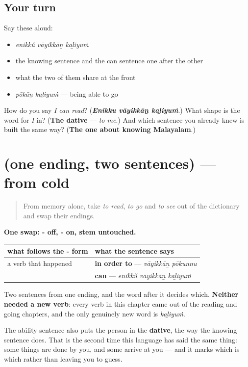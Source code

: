 \subsection*{Your turn}
Say these aloud:

\begin{itemize}
\raggedright
  \item \emph{enikkŭ vāyikkāṉ kaḻiyuṁ}
  \item the knowing sentence and the can sentence one after the other
  \item what the two of them share at the front
  \item \emph{pōkāṉ kaḻiyuṁ} — being able to go
\end{itemize}

\begin{tcolorbox}[breakable,colback=teal!4,colframe=teal!35!black,title={Before you move on}]
How do you say \emph{I can read}? (\emph{\textbf{Enikku vāyikkāṉ kaḻiyuṁ}}.) What shape is the word for \emph{I} in? (\textbf{The dative} — \emph{to me}.) And which sentence you already knew is built the same way? (\textbf{The one about knowing Malayalam}.)
\end{tcolorbox}
\section[(one ending, two sentences)]{(one ending, two sentences) — from cold}

\label{lesson:ML-R74-aan-recall}



\begin{quote}
From memory alone, take \emph{to read}, \emph{to go} and \emph{to see} out of the dictionary and swap their endings.
\end{quote}

\begin{grammarlens}[title={Grammar Lens: the swap, and what it buys}]
\textbf{One swap: - off, - on, stem untouched.}

\noindent
\begin{tabularx}{\linewidth}{@{}>{\raggedright\arraybackslash}X>{\raggedright\arraybackslash}X@{}}
\toprule
\textbf{what follows the -\ml{ആൻ} form} & \textbf{what the sentence says} \\
\midrule
a verb that happened & \textbf{in order to} — \emph{vāyikkāṉ pōkunnu} \\
\textbf{\ml{കഴിയും}} & \textbf{can} — \emph{enikkŭ vāyikkāṉ kaḻiyuṁ} \\
\bottomrule
\end{tabularx}

Two sentences from one ending, and the word after it decides which. \textbf{Neither needed a new verb}: every verb in this chapter came out of the reading and going chapters, and the only genuinely new word is \emph{kaḻiyuṁ}.

The ability sentence also puts the person in the \textbf{dative}, the way the knowing sentence does. That is the second time this language has said the same thing: some things are done by you, and some arrive at you — and it marks which is which rather than leaving you to guess.
\end{grammarlens}

